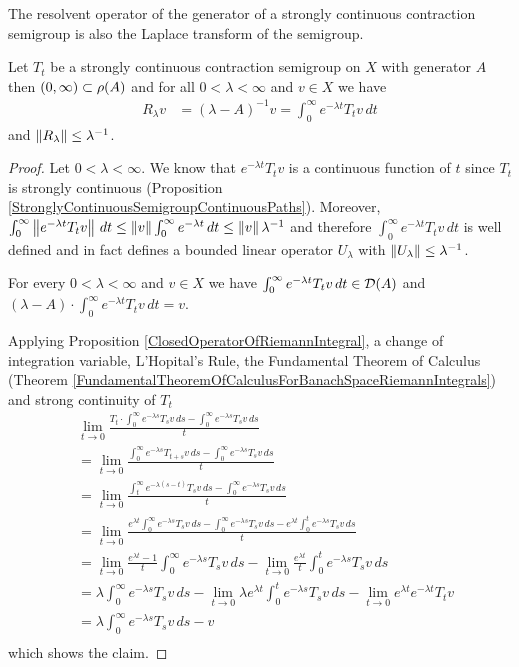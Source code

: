 The resolvent operator of the generator of a strongly continuous contraction semigroup is also the Laplace transform of the semigroup.
\begin{prop}\label{SCCSResolventAsLaplaceTransform}Let $T_t$ be a strongly continuous contraction semigroup on $X$ with generator $A$ then $(0,\infty) \subset \rho(A)$ and 
for all $0 < \lambda < \infty$ and $v \in X$ we have
\begin{align*}
R_\lambda v &= (\lambda - A)^{-1}v = \int_0^\infty e^{-\lambda t} T_tv \, dt
\end{align*}
and $\left \lVert R_\lambda \right \rVert \leq \lambda^{-1}$. 
\end{prop}
\begin{proof}
Let $0 < \lambda < \infty$.  We know that $e^{-\lambda t} T_t v$ is a continuous function of $t$ since $T_t$ is strongly continuous (Proposition \ref{StronglyContinuousSemigroupContinuousPaths}).  Moreover,
$\int_0^\infty \left \lVert e^{-\lambda t} T_t v \right \rVert \, dt \leq \left \lVert v \right \rVert \int_0^\infty e^{-\lambda t} \, dt \leq \left \lVert v \right \rVert \lambda^{-1}$ and therefore $\int_0^\infty e^{-\lambda t} T_tv \, dt$ is well defined
and in fact defines a bounded linear operator $U_\lambda$ with $\left \lVert U_\lambda \right \rVert \leq \lambda^{-1}$. 

\begin{clm}For every $0 < \lambda < \infty$ and $v \in X$ we have $\int_0^\infty e^{-\lambda t} T_t v \, dt \in \mathcal{D}(A)$ and $(\lambda - A) \cdot \int_0^\infty e^{-\lambda t} T_t v \, dt = v$.
\end{clm}
Applying Proposition \ref{ClosedOperatorOfRiemannIntegral}, a change of integration variable, L'Hopital's Rule, the Fundamental Theorem of Calculus (Theorem \ref{FundamentalTheoremOfCalculusForBanachSpaceRiemannIntegrals}) and strong continuity of $T_t$
\begin{align*}
&\lim_{t \to 0} \frac{T_t \cdot \int_0^\infty e^{-\lambda s} T_s v \, ds - \int_0^\infty e^{-\lambda s} T_s v \, ds}{t} \\
&=\lim_{t \to 0} \frac{\int_0^\infty e^{-\lambda s} T_{t+s} v \, ds - \int_0^\infty e^{-\lambda s} T_s v \, ds}{t} \\
&=\lim_{t \to 0} \frac{\int_t^\infty e^{-\lambda (s-t)} T_{s} v \, ds - \int_0^\infty e^{-\lambda s} T_s v \, ds}{t} \\
&=\lim_{t \to 0} \frac{e^{\lambda t} \int_0^\infty e^{-\lambda s} T_{s} v \, ds - \int_0^\infty e^{-\lambda s} T_s v \, ds - e^{\lambda t} \int_0^t e^{-\lambda s} T_{s} v \, ds}{t} \\
&=\lim_{t \to 0} \frac{e^{\lambda t} - 1}{t} \int_0^\infty e^{-\lambda s} T_{s} v \, ds - \lim_{t \to 0} \frac{e^{\lambda t}}{t} \int_0^t e^{-\lambda s} T_{s} v \, ds\\
&= \lambda \int_0^\infty e^{-\lambda s} T_{s} v \, ds - \lim_{t \to 0} \lambda e^{\lambda t} \int_0^t e^{-\lambda s} T_{s} v \, ds - \lim_{t \to 0} e^{\lambda t}  e^{-\lambda t} T_{t} v\\
&= \lambda \int_0^\infty e^{-\lambda s} T_{s} v \, ds - v\\
\end{align*}
which shows the claim.


\end{proof}
